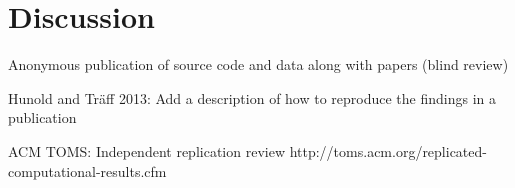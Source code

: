 
\chapter{Discussion}


Anonymous publication of source code and data along with papers (blind review)

Hunold and Träff 2013: Add a description of how to reproduce the findings in a publication

ACM TOMS: Independent replication review http://toms.acm.org/replicated-computational-results.cfm

\cleardoublepage
